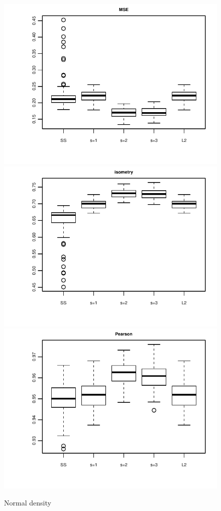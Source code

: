 \begin{figure}
\centering
\includegraphics[height=0.3\textheight]{sim_results/sce=2_SNR=high_Kobs=30_MSE}
\includegraphics[height=0.3\textheight]{sim_results/sce=2_SNR=high_Kobs=30_isometry}
\includegraphics[height=0.3\textheight]{sim_results/sce=2_SNR=high_Kobs=30_Pearson}
\caption{Normal density}
\label{fig:normal}
\end{figure}

